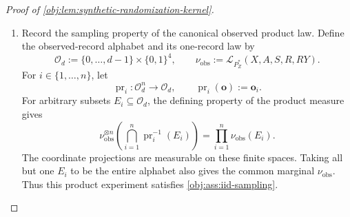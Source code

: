 \begin{proof}[Proof of \cref{obj:lem:synthetic-randomization-kernel}]
\begin{enumerate}
The same calculation gives
\[
P_Z^*(A=a,X=x-1,S=0,R=1)
=\frac{p_x}{2}\beta^{\mathrm{mark}}_{ax},
\qquad
p_{a,x-1,1}(P_Z^*)=0.
\]
Thus an occupied cell has \(S=0\) and \(p_x>0\). By the observational positivity bounds,
\[
\begin{aligned}
\rho_{0,x-1,0}(P_Z^*)&=1-\pi_x\ge q,\\
\rho_{1,x-1,0}(P_Z^*)&=\pi_x\ge q.
\end{aligned}
\]
This establishes \cref{obj:ass:occupied-cell-arrival}. Finally, \(n\ge1\), membership of \(P_Z\) in the observational class supplies \(d\ge1\), and \(0<q<1/2\) implies \(q\le1\). Hence
\[
P_Z^*\in\mathcal M^+_{n,d,q}
\]
by \cref{obj:def:unrestricted-arrival-model-class}.

\item Record the sampling property of the canonical observed product law. Define the observed-record alphabet and its one-record law by
\[
\mathcal O_d:=\{0,\ldots,d-1\}\times\{0,1\}^4,
\qquad
\nu_{\mathrm{obs}}
:=\mathcal L_{P_Z^*}(X,A,S,R,RY).
\]
For \(i\in\{1,\ldots,n\}\), let
\[
\operatorname{pr}_i:\mathcal O_d^n\longrightarrow\mathcal O_d,
\qquad
\operatorname{pr}_i(\mathbf o):=\mathbf o_i.
\]
For arbitrary subsets \(E_i\subseteq\mathcal O_d\), the defining property of the product measure gives
\[
\nu_{\mathrm{obs}}^{\otimes n}
\left(\bigcap_{i=1}^n\operatorname{pr}_i^{-1}(E_i)\right)
=
\prod_{i=1}^n\nu_{\mathrm{obs}}(E_i).
\]
The coordinate projections are measurable on these finite spaces. Taking all but one \(E_i\) to be the entire alphabet also gives the common marginal \(\nu_{\mathrm{obs}}\). Thus this product experiment satisfies \cref{obj:ass:iid-sampling}.


\end{enumerate}
\end{proof}
